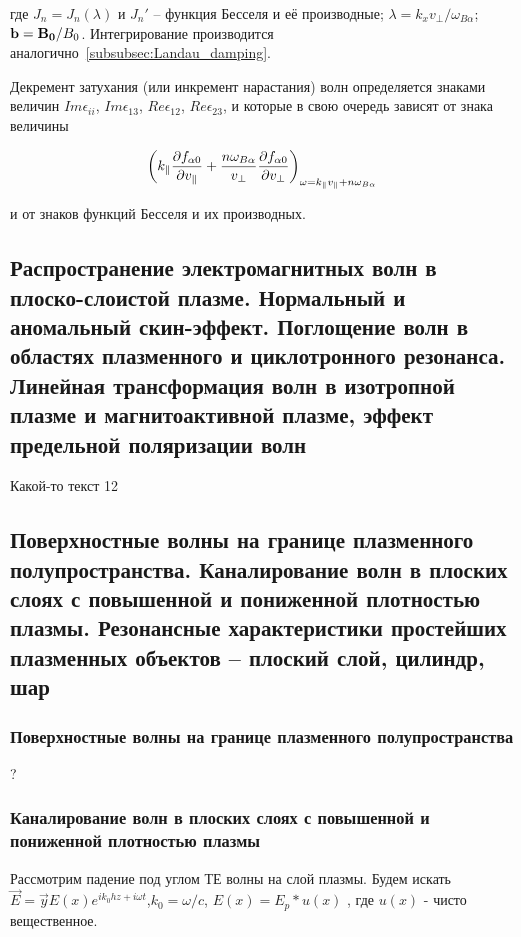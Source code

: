 \documentclass[10pt, a4paper]{article}
\begin{document}
где $J_n = J_n(\lambda)$ и $J_n'$ -- функция Бесселя и её производные; $\lambda = k_xv_\perp/\omega_{B\alpha}$; $\vb{b}=\vb{B_0}/B_0$. Интегрирование производится аналогично~\ref{subsubsec:Landau_damping}.

Декремент затухания (или инкремент нарастания) волн определяется знаками величин $Im\epsilon_{ii}$, $Im\epsilon_{13}$, $Re\epsilon_{12}$, $Re\epsilon_{23}$, и которые в свою очередь зависят от знака величины

\begin{equation*}
	\left(k_\parallel\pdv{f_{\alpha 0}}{v_\parallel}+\frac{n\omega_{B\alpha}}{v_\perp}\pdv{f_{\alpha 0}}{v_\perp}\right)_{\omega=k_\parallel v_\parallel+n\omega_{B\alpha}} 
\end{equation*}

и от знаков функций Бесселя и их производных.

\subsection{Распространение электромагнитных волн в плоско-слоистой плазме. Нормальный и аномальный скин-эффект. Поглощение волн в областях плазменного и циклотронного резонанса. Линейная трансформация волн в изотропной плазме и магнитоактивной плазме, эффект предельной поляризации волн}

Какой-то текст 12

\subsection{Поверхностные волны на границе плазменного полупространства. Каналирование волн в плоских слоях с повышенной и пониженной плотностью плазмы. Резонансные характеристики простейших плазменных объектов – плоский слой, цилиндр, шар}

\subsubsection{Поверхностные волны на границе плазменного полупространства}
?

\subsubsection{Каналирование волн в плоских слоях с повышенной и пониженной плотностью плазмы}

Рассмотрим падение под углом ТЕ волны на слой плазмы. Будем искать $\vec E = \vec y E(x) e^{i k_0 h z + i \omega t}$,$k_0=\omega / c$, $E(x)=E_p * u(x)$ , где $u(x)$ - чисто вещественное.
\end{document}
